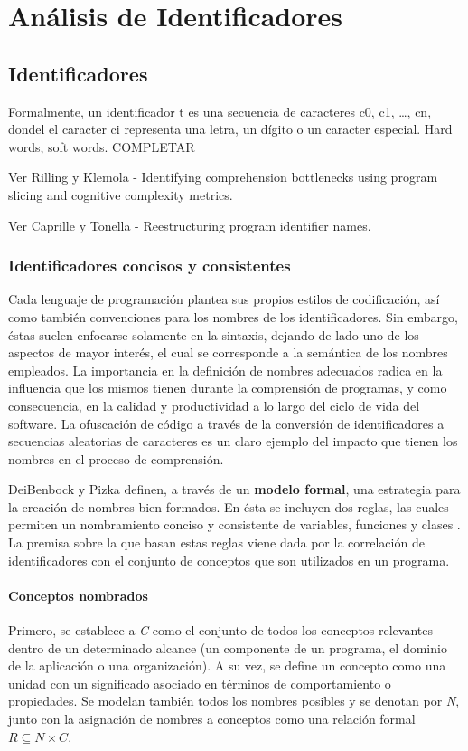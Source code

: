 \chapter{Análisis de Identificadores}

\section{Identificadores}
Formalmente, un identificador t es una secuencia de caracteres c0, c1, …, cn, dondel el caracter ci representa una letra, un dígito o un caracter especial. Hard words, soft words. COMPLETAR

Ver Rilling y Klemola - Identifying comprehension bottlenecks using program slicing and cognitive complexity metrics.

Ver Caprille y Tonella - Reestructuring program identifier names.

\subsection{Identificadores concisos y consistentes}
Cada lenguaje de programación plantea sus propios estilos de codificación, así como también convenciones para los nombres de los identificadores. Sin embargo, éstas suelen enfocarse solamente en la sintaxis, dejando de lado uno de los aspectos de mayor interés, el cual se corresponde a la semántica de los nombres empleados. La importancia en la definición de nombres adecuados radica en la influencia que los mismos tienen durante la comprensión de programas, y como consecuencia, en la calidad y productividad a lo largo del ciclo de vida del software. La ofuscación de código a través de la conversión de identificadores a secuencias aleatorias de caracteres es un claro ejemplo del impacto que tienen los nombres en el proceso de comprensión.

DeiBenbock y Pizka definen, a través de un \textbf{modelo formal}, una estrategia para la creación de nombres bien formados. En ésta se incluyen dos reglas, las cuales permiten un nombramiento conciso y consistente de variables, funciones y clases \cite{DeiBenbockPizka05}. La premisa sobre la que basan estas reglas viene dada por la correlación de identificadores con el conjunto de conceptos que son utilizados en un programa.

\subsubsection{Conceptos nombrados}
Primero, se establece a \textit{C} como el conjunto de todos los conceptos relevantes dentro de un determinado alcance (un componente de un programa, el dominio de la aplicación o una organización). A su vez, se define un concepto como una unidad con un significado asociado en términos de comportamiento o propiedades. Se modelan también todos los nombres posibles y se denotan por \textit{N}, junto con la asignación de nombres a conceptos como una relación formal $R \subseteq N \times C$.

